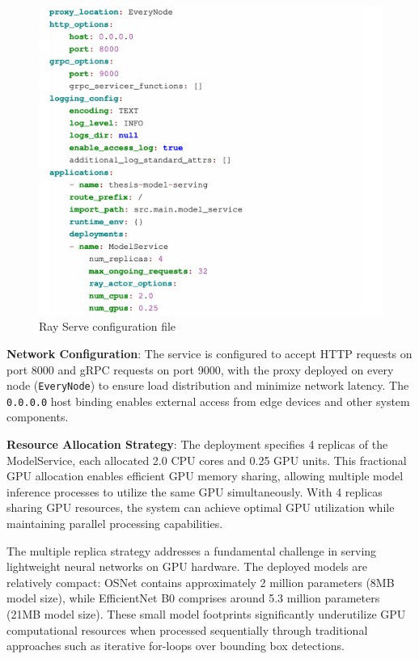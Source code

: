 \begin{figure}[htbp]
    \centering
    \includegraphics[width=1\textwidth]{Figure/rayserve_conf.png}
    \caption{Ray Serve configuration file}
    \label{fig:ray_serve_config}
\end{figure}


\textbf{Network Configuration}: The service is configured to accept HTTP requests on port 8000 and gRPC requests on port 9000, with the proxy deployed on every node (\texttt{EveryNode}) to ensure load distribution and minimize network latency. The \texttt{0.0.0.0} host binding enables external access from edge devices and other system components.

\textbf{Resource Allocation Strategy}: The deployment specifies 4 replicas of the ModelService, each allocated 2.0 CPU cores and 0.25 GPU units. This fractional GPU allocation enables efficient GPU memory sharing, allowing multiple model inference processes to utilize the same GPU simultaneously. With 4 replicas sharing GPU resources, the system can achieve optimal GPU utilization while maintaining parallel processing capabilities.

The multiple replica strategy addresses a fundamental challenge in serving lightweight neural networks on GPU hardware. The deployed models are relatively compact: OSNet contains approximately 2 million parameters (8MB model size), while EfficientNet B0 comprises around 5.3 million parameters (21MB model size). These small model footprints significantly underutilize GPU computational resources when processed sequentially through traditional approaches such as iterative for-loops over bounding box detections.

